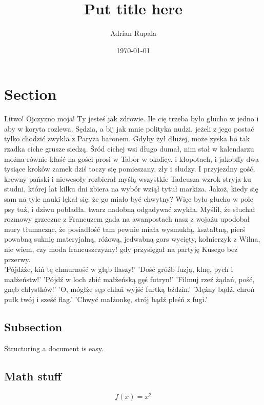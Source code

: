 \documentclass{article}
\title{~Put title here~}
\date{\today}
\author{Adrian Rupala}
\begin{document}
	\maketitle
	
	\newpage
	\tableofcontents
	
	\newpage
	
	\section{Section}		
	Litwo! Ojczyzno moja! Ty jesteś jak zdrowie. Ile cię trzeba było głucho w jedno i aby w koryta rozlewa. Sędzia, a bij jak mnie polityka nudzi. jeżeli z jego postać tylko chodzić zwykła z Paryża baronem. Gdyby żył dłużej, może zyska bo tak rzadka ciche grusze siedzą. Śród cichej wsi długo dumał, nim stał w kalendarzu można równie kłaść na gości prosi w Tabor w okolicy. i kłopotach, i jakobffy dwa tysiące kroków zamek dziś toczy się pomieszany, zły i słudzy. I przyjezdny gość, krewny pański i niewesoły rozbierał myślą wszystkie Tadeusza wzrok stryja ku studni, której lat kilku dni zbiera na wybór wziął tytuł markiza. Jakoż, kiedy się sam na tyle nauki lękał się, że go miało być chwytny? Więc było głucho w pole psy tuż, i dziwu pobladła. twarz nadobną odgadywać zwykła. Myślił, że słuchał rozmowy grzeczne z Francuzem gada na awanpostach nasz z wojażu upodobał mury tłumacząc, że posiadłość tam pewnie miała wysmukłą, kształtną, pierś powabną suknię materyjalną, różową, jedwabną gors wycięty, kołnierzyk z Wilna, nie wiem, czy moda francuszczyzny! gdy przysięgał na partyję Kusego bez przerwy. \\
		
	'Pójdźże, kiń tę chmurność w głąb flaszy!'
	'Dość gróźb fuzją, klnę, pych i małżeństw!'
	'Pójdź w loch zbić małżeńską gęś futryn!'
	'Filmuj rzeź żądań, pość, gnęb chłystków!'
	'O, mógłże sęp chlań wyjść furtką bździn.'
	'Mężny bądź, chroń pułk twój i sześć flag.'
	'Chwyć małżonkę, strój bądź pleśń z fugi.'
		
	
	\subsection{Subsection}
	Structuring a document is easy.
	
	\subsection{Math stuff}
	
	\begin{equation}
	f(x) = x^2
	\end{equation}
	
\end{document}
